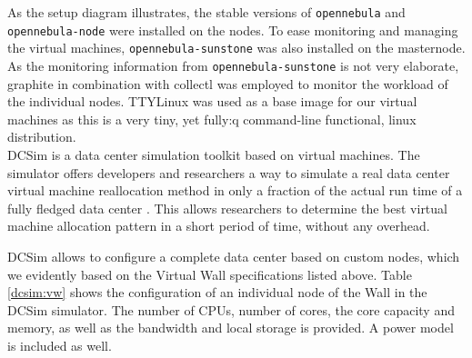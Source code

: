 \documentclass[conference, 10pt]{IEEEtran}
\begin{document}
As the setup diagram illustrates, the stable versions of \texttt{opennebula} and \texttt{opennebula-node} were installed on the nodes. To ease monitoring and managing the virtual machines, \texttt{opennebula-sunstone} was also installed on the masternode. As the monitoring information from \texttt{opennebula-sunstone} is not very elaborate, graphite\cite{graphite} in combination with collectl \cite{collectl} was employed to monitor the workload of the individual nodes.
TTYLinux\cite{ttylinux} was used as a base image for our virtual machines as this is a very tiny, yet fully:q command-line functional, linux distribution.\\

DCSim is a data center simulation toolkit based on virtual machines. The simulator offers developers and researchers a way to simulate a real data center virtual machine reallocation method in only a fraction of the actual run time of a fully fledged data center \cite{dcsim:slideshow, dcsim:paper, dcsim:paper2}. This allows researchers to determine the best virtual machine allocation pattern in a short period of time, without any overhead.

DCSim allows to configure a complete data center based on custom nodes, which we evidently based on the Virtual Wall specifications listed above. Table \ref{dcsim:vw} shows the configuration of an individual node of the Wall in the DCSim simulator. The number of CPUs, number of cores, the core capacity and memory, as well as the bandwidth and local storage is provided. A power model is included as well.\\
\end{document}
